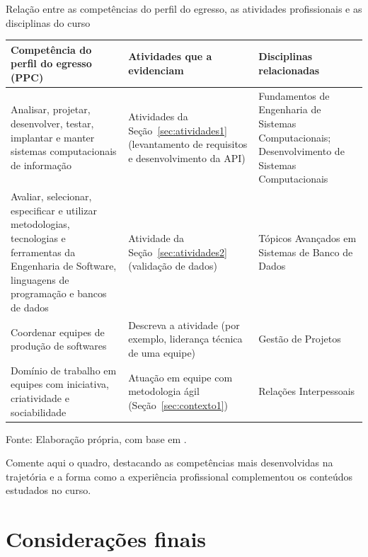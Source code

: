 \documentclass[memorial,capa]{texifsap}
\begin{document}
\begin{quadro}[htbp]
\caption{Relação entre as competências do perfil do egresso, as atividades profissionais e as disciplinas do curso}
\label{quadro-egresso}
\centering\begin{tabular}{|L{5.4cm}|L{4.8cm}|L{4.2cm}|}
\hline
\textbf{Competência do perfil do egresso (PPC)} & \textbf{Atividades que a evidenciam} & \textbf{Disciplinas relacionadas}\\
\hline
{\small Analisar, projetar, desenvolver, testar, implantar e manter sistemas computacionais de informação} & {\small Atividades da Seção~\ref{sec:atividades1} (levantamento de requisitos e desenvolvimento da API)} & {\small Fundamentos de Engenharia de Sistemas Computacionais; Desenvolvimento de Sistemas Computacionais}\\
\hline
{\small Avaliar, selecionar, especificar e utilizar metodologias, tecnologias e ferramentas da Engenharia de Software, linguagens de programação e bancos de dados} & {\small Atividade da Seção~\ref{sec:atividades2} (validação de dados)} & {\small Tópicos Avançados em Sistemas de Banco de Dados}\\
\hline
{\small Coordenar equipes de produção de softwares} & {\small Descreva a atividade (por exemplo, liderança técnica de uma equipe)} & {\small Gestão de Projetos}\\
\hline
{\small Domínio de trabalho em equipes com iniciativa, criatividade e sociabilidade} & {\small Atuação em equipe com metodologia ágil (Seção~\ref{sec:contexto1})} & {\small Relações Interpessoais}\\
\hline
\end{tabular}
\begin{flushleft}
{\small Fonte: Elaboração própria, com base em \citet{IFSul:PPC}.}
\end{flushleft}
\end{quadro}

Comente aqui o quadro, destacando as competências mais desenvolvidas na
trajetória e a forma como a experiência profissional complementou os
conteúdos estudados no curso.

\chapter{Considerações finais}
\label{cap:consideracoes}

\end{document}
